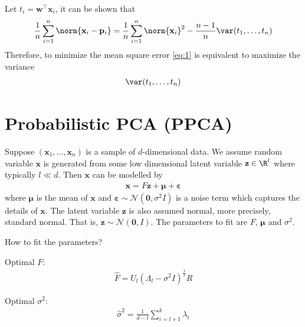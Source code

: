 \documentclass[color=blue, thmcnt=section, 12pt]{elegantbook}
\begin{document}
\par Let $t_i = \mathbf{w}^\top \mathbf{x}_i$, it can be shown that 
\begin{align*}
    \frac{1}{n} \sum_{i=1}^n \norm{\mathbf{x}_i - \mathbf{p}_i}
    = \frac{1}{n} \sum_{i=1}^n \norm{\mathbf{x}_i}^2
    - \frac{n-1}{n} \var(t_1, \ldots, t_n)
\end{align*}
Therefore, to minimize the mean square error \eqref{eq:1} is equivalent to maximize the variance
\begin{align*}
    \var(t_1, \ldots, t_n)
\end{align*}


\section{Probabilistic PCA (PPCA)}


\par Suppose $(\mathbf{x}_1, \ldots, \mathbf{x}_n)$ is a sample of $d$-dimensional data. We assume random variable $\mathbf{x}$ is generated from some low dimensional latent variable $\mathbf{z} \in \R^l$ where typically $l \ll d$. Then $\mathbf{x}$ can be modelled by 
\begin{align*}
    \mathbf{x} = F \mathbf{z} + \boldsymbol{\mu} + \boldsymbol{\varepsilon}
\end{align*}
where $\boldsymbol{\mu}$ is the mean of $\mathbf{x}$ and $\boldsymbol{\varepsilon} \sim \mathcal{N}(\mathbf{0}, \sigma^2 I)$ is a noise term which captures the details of $\mathbf{x}$. The latent variable $\mathbf{z}$ is also assumed normal, more precisely, standard normal. That is, $\mathbf{z} \sim \mathcal{N}(\mathbf{0}, I)$. The parameters to fit are $F$, $\boldsymbol{\mu}$ and $\sigma^2$.

\par How to fit the parameters?

\par Optimal $F$:
\begin{align*}
    \hat{F} = U_l \left( \Lambda_l - \sigma^2 I \right)^{\frac{1}{2}} R
\end{align*}


\par Optimal $\sigma^2$:
\begin{align*}
    \hat{\sigma}^2 = \frac{1}{d - l} \sum_{i=l+1}^k \lambda_i
\end{align*}


    
\end{document}
